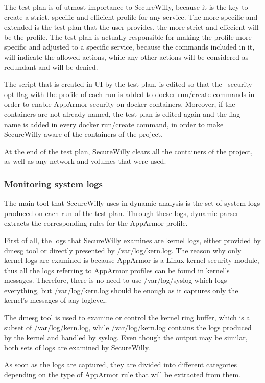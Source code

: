 The test plan is of utmost importance to SecureWilly, because it is the key to create a strict, specific and efficient profile for any service. The more specific and extended is the test plan that the user provides, the more strict and effecient will be the profile. The test plan is actually responsible for making the profile more specific and adjusted to a specific service, because the commands included in it, will indicate the allowed actions, while any other actions will be considered as redundant and will be denied.

The script that is created in UI by the test plan, is edited so that the --security-opt flag with the profile of each run is added to docker run/create commands in order to enable AppArmor security on docker containers. Moreover, if the containers are not already named, the test plan is edited again and the flag --name is added in every docker run/create command, in order to make SecureWilly aware of the containers of the project.

At the end of the test plan, SecureWilly clears all the containers of the project, as well as any network and volumes that were used.

\subsubsection{Monitoring system logs}
The main tool that SecureWilly uses in dynamic analysis is the set of system logs produced on each run of the test plan. Through these logs, dynamic parser extracts the corresponding rules for the AppArmor profile.

First of all, the logs that SecureWilly examines are kernel logs, either provided by dmesg tool or directly presented by /var/log/kern.log. The reason why only kernel logs are examined is because AppArmor is a Linux kernel security module, thus all the logs referring to AppArmor profiles can be found in kernel's messages. Therefore, there is no need to use /var/log/syslog which logs everything, but /var/log/kern.log should be enough as it captures only the kernel's messages of any loglevel. 

The dmesg tool is used to examine or control the kernel ring buffer, which is a subset of /var/log/kern.log, while /var/log/kern.log contains the logs produced by the kernel and handled by syslog. Even though the output may be similar, both sets of logs are examined by SecureWilly.

As soon as the logs are captured, they are divided into different categories depending on the type of AppArmor rule that will be extracted from them.

